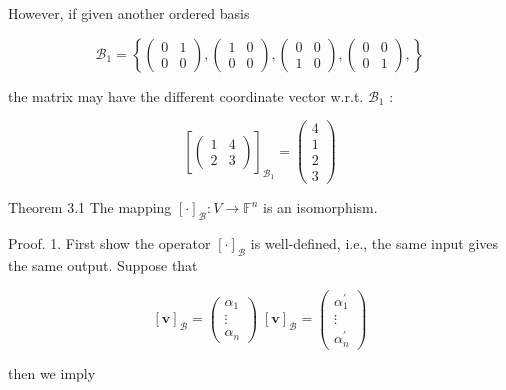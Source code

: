 \documentclass[11pt]{article}
\begin{document}
However, if given another ordered basis

\[
{\mathcal{B}}_1 = \left\{  {\left( \begin{array}{ll} 0 & 1 \\  0 & 0 \end{array}\right) ,\left( \begin{array}{ll} 1 & 0 \\  0 & 0 \end{array}\right) ,\left( \begin{array}{ll} 0 & 0 \\  1 & 0 \end{array}\right) ,\left( \begin{array}{ll} 0 & 0 \\  0 & 1 \end{array}\right) ,}\right\}
\]

the matrix may have the different coordinate vector w.r.t. \({\mathcal{B}}_1\) :

\[
{\left\lbrack  \left( \begin{array}{ll} 1 & 4 \\  2 & 3 \end{array}\right) \right\rbrack  }_{{\mathcal{B}}_1} = \left( \begin{array}{l} 4 \\  1 \\  2 \\  3 \end{array}\right)
\]

Theorem 3.1 The mapping \({\left\lbrack  \cdot \right\rbrack  }_{\mathcal{B}} : V \rightarrow  {\mathbb{F}}^n\) is an isomorphism.

Proof. 1. First show the operator \({\left\lbrack  \cdot \right\rbrack  }_{\mathcal{B}}\) is well-defined, i.e., the same input gives the same output. Suppose that

\[
{\left\lbrack  \mathbf{v}\right\rbrack  }_{\mathcal{B}} = \left( \begin{matrix} \alpha_1 \\  \vdots \\  \alpha_n \end{matrix}\right) \;{\left\lbrack  \mathbf{v}\right\rbrack  }_{\mathcal{B}} = \left( \begin{matrix} \alpha_1^{\prime } \\  \vdots \\  \alpha_n^{\prime } \end{matrix}\right)
\]

then we imply
\end{document}
